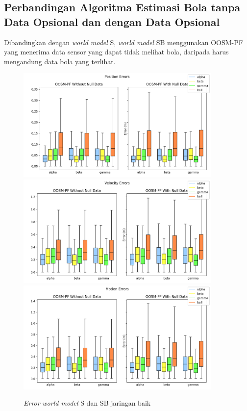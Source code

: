 \subsection{Perbandingan Algoritma Estimasi Bola tanpa Data Opsional dan dengan Data Opsional}

Dibandingkan dengan \textit{world model} S, \textit{world model} SB menggunakan OOSM-PF yang menerima data sensor yang dapat tidak melihat bola, daripada harus mengandung data bola yang terlihat.

\begin{figure}[p]
    \centering
    \medskip
    \includegraphics[width=0.9\textwidth]{resources/cfg1_AS_ASB_error_pos.png}
    \includegraphics[width=0.9\textwidth]{resources/cfg1_AS_ASB_error_vel.png}
    \includegraphics[width=0.9\textwidth]{resources/cfg1_AS_ASB_error_motion.png}
    \caption{\textit{Error} \textit{world model} S dan SB jaringan baik}
    \label{fig:1-s-sb-error}
    \bigskip
\end{figure}


